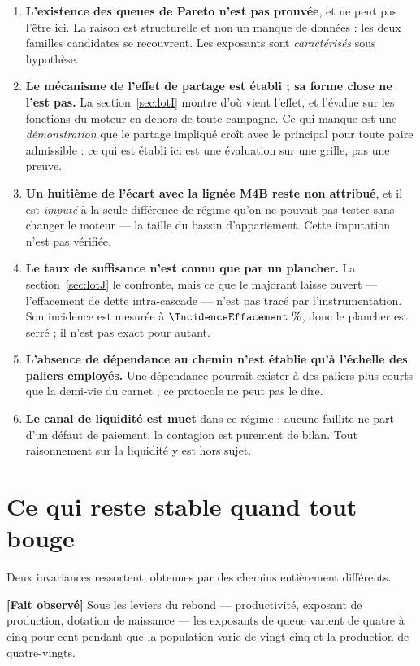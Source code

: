 \documentclass[11pt,a4paper]{article}
\newcommand{\fait}{\textbf{[Fait observé]}}
\begin{document}
\begin{enumerate}
\item \textbf{L'existence des queues de Pareto n'est pas prouvée}, et ne peut
      pas l'être ici. La raison est structurelle et non un manque de données :
      les deux familles candidates se recouvrent. Les exposants sont
      \emph{caractérisés} sous hypothèse.
\item \textbf{Le mécanisme de l'effet de partage est établi ; sa forme
      close ne l'est pas.} La section~\ref{sec:lotI} montre d'où vient
      l'effet, et l'évalue sur les fonctions du moteur en dehors de toute
      campagne. Ce qui manque est une \emph{démonstration} que le partage
      impliqué croît avec le principal pour toute paire admissible : ce qui
      est établi ici est une évaluation sur une grille, pas une preuve.
\item \textbf{Un huitième de l'écart avec la lignée M4B reste non attribué}, et
      il est \emph{imputé} à la seule différence de régime qu'on ne pouvait
      pas tester sans changer le moteur --- la taille du bassin
      d'appariement. Cette imputation n'est pas vérifiée.
\item \textbf{Le taux de suffisance n'est connu que par un plancher.} La
      section~\ref{sec:lotJ} le confronte, mais ce que le majorant laisse
      ouvert --- l'effacement de dette intra-cascade --- n'est pas tracé par
      l'instrumentation. Son incidence est mesurée à
      $\IncidenceEffacement~\%$, donc le plancher est serré ; il n'est pas
      exact pour autant.
\item \textbf{L'absence de dépendance au chemin n'est établie qu'à l'échelle
      des paliers employés.} Une dépendance pourrait exister à des paliers
      plus courts que la demi-vie du carnet ; ce protocole ne peut pas le
      dire.
\item \textbf{Le canal de liquidité est muet} dans ce régime : aucune
      faillite ne part d'un défaut de paiement, la contagion est purement de
      bilan. Tout raisonnement sur la liquidité y est hors sujet.
\end{enumerate}

\section{Ce qui reste stable quand tout bouge}

Deux invariances ressortent, obtenues par des chemins entièrement différents.

\fait{} Sous les leviers du rebond --- productivité, exposant de production,
dotation de naissance --- les exposants de queue varient de quatre à cinq
pour-cent pendant que la population varie de vingt-cinq et la production de
quatre-vingts.
\end{document}
